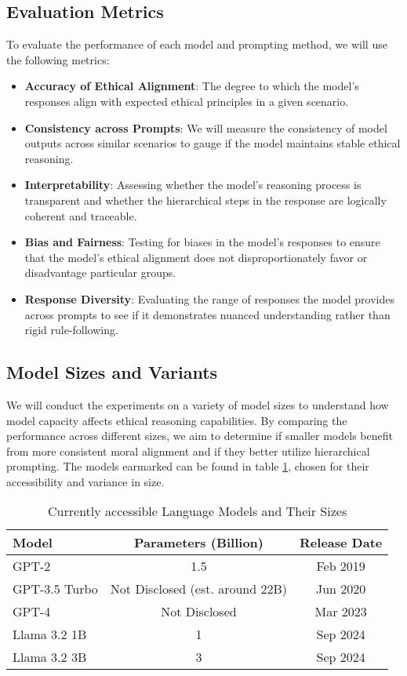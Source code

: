 \documentclass{article}
\begin{document}
\subsection{Evaluation Metrics}

To evaluate the performance of each model and prompting method, we will use the following metrics:

\begin{itemize}
    \item \textbf{Accuracy of Ethical Alignment}: The degree to which the model's responses align with expected ethical principles in a given scenario.
    \item \textbf{Consistency across Prompts}: We will measure the consistency of model outputs across similar scenarios to gauge if the model maintains stable ethical reasoning.
    \item \textbf{Interpretability}: Assessing whether the model’s reasoning process is transparent and whether the hierarchical steps in the response are logically coherent and traceable.
    \item \textbf{Bias and Fairness}: Testing for biases in the model's responses to ensure that the model's ethical alignment does not disproportionately favor or disadvantage particular groups.
    \item \textbf{Response Diversity}: Evaluating the range of responses the model provides across prompts to see if it demonstrates nuanced understanding rather than rigid rule-following.
\end{itemize}

\subsection{Model Sizes and Variants}

We will conduct the experiments on a variety of model sizes to understand how model capacity affects ethical reasoning capabilities. By comparing the performance across different sizes, we aim to determine if smaller models benefit from more consistent moral alignment and if they better utilize hierarchical prompting. The models earmarked can be found in table \ref{tab:language_models}, chosen for their accessibility and variance in size.

\begin{table}[h]
\centering
\begin{tabular}{|l|c|c|}
\hline
\textbf{Model} & \textbf{Parameters (Billion)} & \textbf{Release Date} \\
\hline
GPT-2 \cite{radford_language_nodate} & 1.5 & Feb 2019 \\
GPT-3.5 Turbo \cite{brown_language_2020} & Not Disclosed  (est. around 22B) & Jun 2020 \\
GPT-4 \cite{openai_gpt-4_2024} & Not Disclosed & Mar 2023 \\
Llama 3.2 1B \cite{noauthor_llama_nodate} & 1 & Sep 2024 \\
Llama 3.2 3B \cite{noauthor_llama_nodate} & 3 & Sep 2024 \\
\hline
\end{tabular}
\caption{Currently accessible Language Models and Their Sizes}
\label{tab:language_models}
\end{table}
\end{document}
